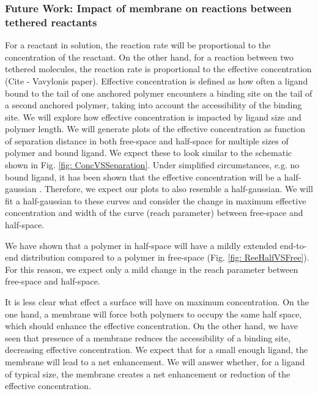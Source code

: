 \documentclass[../../AdvancementSummary.tex]{subfiles}
\begin{document}
\subsubsection{Future Work: Impact of membrane on reactions between tethered reactants}

For a reactant in solution, the reaction rate will be proportional to the concentration of the reactant. On the other hand, for a reaction between two tethered molecules, the reaction rate is proportional to the effective concentration \cite{VanValen2009,Bryant2017} (Cite - Vavylonis paper).
Effective concentration is defined as how often a ligand bound to the tail of one anchored polymer encounters a binding site on the tail of a second anchored polymer, taking into account the accessibility of the binding site. 
We will explore how effective concentration is impacted by ligand size and polymer length. We will generate plots of the effective concentration as function of separation distance in both free-space and half-space for multiple sizes of polymer and bound ligand. We expect these to look similar to the schematic shown in Fig. \ref{fig: ConcVSSeparation}. Under simplified circumstances, e.g. no bound ligand, it has been shown that the effective concentration will be a half-gaussian \cite{Goyette2017}. Therefore, we expect our plots to also resemble a half-gaussian. We will fit a half-gaussian to these curves and consider the change in maximum effective concentration and width of the curve (reach parameter) between free-space and half-space. 

We have shown that a polymer in half-space will have a mildly extended end-to-end distribution compared to a polymer in free-space (Fig. \ref{fig: ReeHalfVSFree}). For this reason, we expect only a mild change in the reach parameter between free-space and half-space. 

It is less clear what effect a surface will have on maximum concentration. 
	On the one hand, a membrane will force both polymers to occupy the same half space, which should enhance the effective concentration.
	On the other hand, we have seen that presence of a membrane reduces the accessibility of a binding site, decreasing effective concentration. 
	We expect that for a small enough ligand, the membrane will lead to a net enhancement. We will answer whether, for a ligand of typical size, the membrane creates a net enhancement or reduction of the effective concentration.
\end{document}
